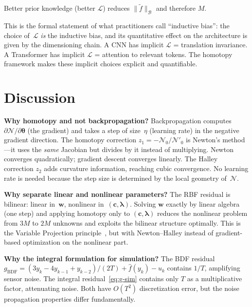 \documentclass[11pt,a4paper]{article}
\begin{document}
Better prior knowledge (better $\mathcal{L}$) reduces $\|\tilde{f}\|_{\mathcal{B}}$ and therefore $M$.

This is the formal statement of what practitioners call ``inductive bias'': the choice of~$\mathcal{L}$ \emph{is} the inductive bias, and its quantitative effect on the architecture is given by the dimensioning chain. A CNN has implicit $\mathcal{L}$ = translation invariance. A Transformer has implicit $\mathcal{L}$ = attention to relevant tokens. The homotopy framework makes these implicit choices explicit and quantifiable.


\section{Discussion}
\label{sec:discussion}

\textbf{Why homotopy and not backpropagation?} Backpropagation computes $\partial\mathcal{N}/\partial\boldsymbol{\theta}$ (the gradient) and takes a step of size~$\eta$ (learning rate) in the negative gradient direction. The homotopy correction $z_1 = -\mathcal{N}_0/\mathcal{N}'_0$ is Newton's method---it uses the \emph{same} Jacobian but divides by it instead of multiplying. Newton converges quadratically; gradient descent converges linearly. The Halley correction $z_2$ adds curvature information, reaching cubic convergence. No learning rate is needed because the step size is determined by the local geometry of~$\mathcal{N}$.

\textbf{Why separate linear and nonlinear parameters?} The RBF residual is bilinear: linear in~$\mathbf{w}$, nonlinear in~$(\mathbf{c}, \boldsymbol{\lambda})$. Solving $\mathbf{w}$ exactly by linear algebra (one step) and applying homotopy only to $(\mathbf{c}, \boldsymbol{\lambda})$ reduces the nonlinear problem from $3M$ to $2M$ unknowns and exploits the bilinear structure optimally. This is the Variable Projection principle~\cite{GolubPereyra1973}, but with Newton--Halley instead of gradient-based optimization on the nonlinear part.

\textbf{Why the integral formulation for simulation?} The BDF residual $g_{\mathrm{BDF}} = (3y_k - 4y_{k-1} + y_{k-2})/(2T) + \hat{f}(y_k) - u_k$ contains $1/T$, amplifying sensor noise. The integral residual~\eqref{eq:g-sim} contains only $T$ as a multiplicative factor, attenuating noise. Both have $O(T^2)$ discretization error, but the noise propagation properties differ fundamentally.
\end{document}

